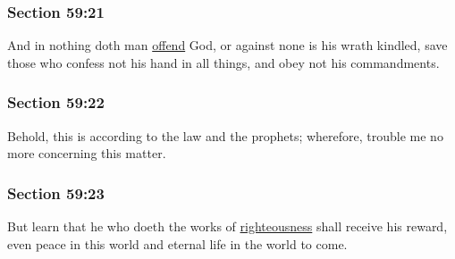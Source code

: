 	\subsubsection{Section 59:21} %
		\label{DC59-21}

		And in nothing doth man \hyperref[OFFENSE]{offend} God, or against none is his wrath kindled, save those who confess not his hand in all things, and obey not his commandments.


	\subsubsection{Section 59:22} %
		\label{DC59-22}

		Behold, this is according to the law and the prophets; wherefore, trouble me no more concerning this matter.


	\subsubsection{Section 59:23} %
		\label{DC59-23}

		But learn that he who doeth the works of \hyperref[RIGHTEOUSNESS]{righteousness} shall receive his reward, even peace in this world and eternal life in the world to come.


